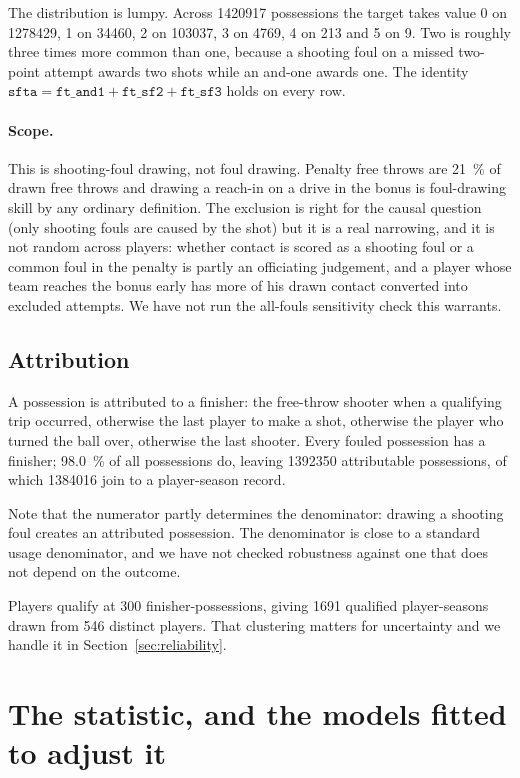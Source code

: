 \documentclass[11pt,a4paper]{article}
\begin{document}
The distribution is lumpy. Across \num{1420917} possessions the target takes
value 0 on \num{1278429}, 1 on \num{34460}, 2 on \num{103037}, 3 on \num{4769},
4 on 213 and 5 on 9. Two is roughly three times more common than one, because a
shooting foul on a missed two-point attempt awards two shots while an and-one
awards one. The identity
$\texttt{sfta} = \texttt{ft\_and1} + \texttt{ft\_sf2} + \texttt{ft\_sf3}$ holds
on every row.

\paragraph{Scope.} This is shooting-foul drawing, not foul drawing. Penalty free
throws are \SI{21}{\percent} of drawn free throws and drawing a reach-in on a
drive in the bonus is foul-drawing skill by any ordinary definition. The
exclusion is right for the causal question (only shooting fouls are caused by the
shot) but it is a real narrowing, and it is not random across players: whether
contact is scored as a shooting foul or a common foul in the penalty is partly an
officiating judgement, and a player whose team reaches the bonus early has more
of his drawn contact converted into excluded attempts. We have not run the
all-fouls sensitivity check this warrants.

\subsection{Attribution}

A possession is attributed to a finisher: the free-throw shooter when a
qualifying trip occurred, otherwise the last player to make a shot, otherwise the
player who turned the ball over, otherwise the last shooter. Every fouled
possession has a finisher; \SI{98.0}{\percent} of all possessions do, leaving
\num{1392350} attributable possessions, of which \num{1384016} join to a
player-season record.

Note that the numerator partly determines the denominator: drawing a shooting
foul creates an attributed possession. The denominator is close to a standard
usage denominator, and we have not checked robustness against one that does not
depend on the outcome.

Players qualify at 300 finisher-possessions, giving \num{1691} qualified
player-seasons drawn from 546 distinct players. That clustering matters for
uncertainty and we handle it in Section~\ref{sec:reliability}.

\section{The statistic, and the models fitted to adjust it}
\end{document}
